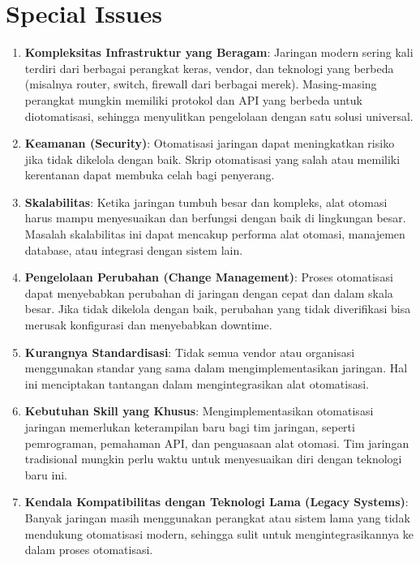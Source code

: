 \section{Special Issues}
\begin{enumerate}
    \item \textbf{Kompleksitas Infrastruktur yang Beragam}: Jaringan modern sering kali terdiri dari berbagai perangkat keras, vendor, dan teknologi yang berbeda (misalnya router, switch, firewall dari berbagai merek). Masing-masing perangkat mungkin memiliki protokol dan API yang berbeda untuk diotomatisasi, sehingga menyulitkan pengelolaan dengan satu solusi universal.
    
    \item \textbf{Keamanan (Security)}: Otomatisasi jaringan dapat meningkatkan risiko jika tidak dikelola dengan baik. Skrip otomatisasi yang salah atau memiliki kerentanan dapat membuka celah bagi penyerang.
    
    \item \textbf{Skalabilitas}: Ketika jaringan tumbuh besar dan kompleks, alat otomasi harus mampu menyesuaikan dan berfungsi dengan baik di lingkungan besar. Masalah skalabilitas ini dapat mencakup performa alat otomasi, manajemen database, atau integrasi dengan sistem lain.
    
    \item \textbf{Pengelolaan Perubahan (Change Management)}: Proses otomatisasi dapat menyebabkan perubahan di jaringan dengan cepat dan dalam skala besar. Jika tidak dikelola dengan baik, perubahan yang tidak diverifikasi bisa merusak konfigurasi dan menyebabkan downtime.
    
    \item \textbf{Kurangnya Standardisasi}: Tidak semua vendor atau organisasi menggunakan standar yang sama dalam mengimplementasikan jaringan. Hal ini menciptakan tantangan dalam mengintegrasikan alat otomatisasi.
    
    \item \textbf{Kebutuhan Skill yang Khusus}: Mengimplementasikan otomatisasi jaringan memerlukan keterampilan baru bagi tim jaringan, seperti pemrograman, pemahaman API, dan penguasaan alat otomasi. Tim jaringan tradisional mungkin perlu waktu untuk menyesuaikan diri dengan teknologi baru ini.
    
    \item \textbf{Kendala Kompatibilitas dengan Teknologi Lama (Legacy Systems)}: Banyak jaringan masih menggunakan perangkat atau sistem lama yang tidak mendukung otomatisasi modern, sehingga sulit untuk mengintegrasikannya ke dalam proses otomatisasi.
\end{enumerate}



